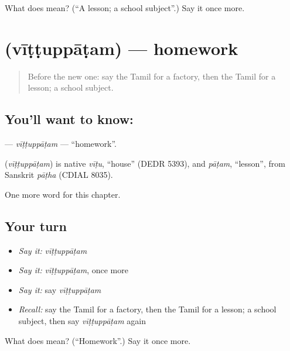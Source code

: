 \begin{tcolorbox}[breakable,colback=teal!4,colframe=teal!35!black,title={Before you move on}]
What does  mean? (\textquotedblleft{}A lesson; a school subject\textquotedblright{}.) Say it once more.
\end{tcolorbox}
\section[\texorpdfstring{\ta{வீட்டுப்பாடம்} (vīṭṭuppāṭam)}{வீட்டுப்பாடம் (vīṭṭuppāṭam)}]{ (vīṭṭuppāṭam) — homework}

\label{lesson:TA-C223-vittuppatam}



\begin{quote}
Before the new one: say the Tamil for a factory, then the Tamil for a lesson; a school subject.
\end{quote}

\subsection*{You'll want to know: }
\textbf{} — \emph{vīṭṭuppāṭam} — \textquotedblleft{}homework\textquotedblright{}.

\begin{cousinweb}
\textbf{} (\emph{vīṭṭuppāṭam}) is native \emph{vīṭu}, \textquotedblleft{}house\textquotedblright{} (DEDR 5393), and \emph{pāṭam}, \textquotedblleft{}lesson\textquotedblright{}, from Sanskrit \emph{pāṭha} (CDIAL 8035).
\end{cousinweb}

\begin{grammarlens}[title={What you've built}]
One more word for this chapter.
\end{grammarlens}

\subsection*{Your turn}
\begin{itemize}
\raggedright
  \item \emph{Say it:} \emph{vīṭṭuppāṭam}
  \item \emph{Say it:} \emph{vīṭṭuppāṭam}, once more
  \item \emph{Say it:} say \emph{vīṭṭuppāṭam}
  \item \emph{Recall:} say the Tamil for a factory, then the Tamil for a lesson; a school subject, then say \emph{vīṭṭuppāṭam} again
\end{itemize}

\begin{tcolorbox}[breakable,colback=teal!4,colframe=teal!35!black,title={Before you move on}]
What does  mean? (\textquotedblleft{}Homework\textquotedblright{}.) Say it once more.
\end{tcolorbox}

